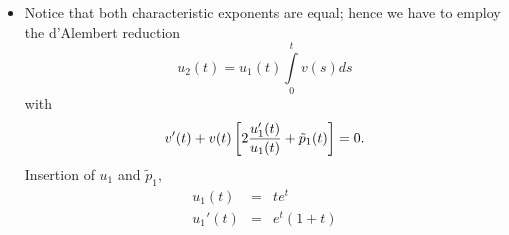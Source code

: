 {\begin{enumerate}
\begin{itemize}
\begin{eqnarray}
         w_n\Bigl[(n+\sigma)(n+\sigma-2)+1\Bigr]-
            w_{n-1}(n+\sigma-1)&=&0. \label{eqn:5.3.2}
      \end{eqnarray}
      ad (\ref{eqn:5.3.1}) for $w_0$:
      \begin{eqnarray*}
         \sigma(\sigma-2)+1&=&0\\
         \sigma^2-2\sigma+1&=&0\\
         (\sigma-1)^2&=&0\quad \Longrightarrow\ \sigma_\infty^{(1,2)}=1
      \end{eqnarray*}
      The characteristic exponent is $\sigma_\infty^{(1)}=
      \sigma_\infty^{(2)}=1$.\medskip\\
      ad (\ref{eqn:5.3.2}) for $w_n$:
      For the coefficients $w_n$ we obtain the recursion formula
      \begin{eqnarray*}
         w_n\Bigl[(n+\sigma)(n+\sigma-2)+1\Bigr]&=&w_{n-1}(n+\sigma-1)\\
         \Longrightarrow\ w_n&=&{n+\sigma-1\over (n+\sigma)(n+\sigma-2)+1}
         w_{n-1}.
      \end{eqnarray*}
      Let us insert $\sigma=1$:
      $$
         w_n={n\over (n+1)(n-1)+1}w_{n-1}={n\over n^2-1+1}w_{n-1}=
         {n\over n^2}w_{n-1}={1\over n}w_{n-1}.
      $$
      We can fix $w_0=1$, hence:
      \begin{eqnarray*}
         w_0&=&1={1\over 1}={1\over 0!}\\
         w_1&=&{1\over 1}={1\over 1!}\\
         w_2&=&{1\over 1\cdot 2}={1\over 2!}\\
         w_3&=&{1\over 1\cdot 2\cdot 3}={1\over 3!}\\
         &\vdots\\
         w_n&=&{1\over 1\cdot 2\cdot 3\cdot\,\cdots\,\cdot n}={1\over n!}
      \end{eqnarray*}
      And finally,
      $$
         u_1(t)=t^\sigma\sum_{n=0}^\infty w_n t^n=t\sum_{n=0}^\infty
         {t^n\over n!}=te^t .
      $$
\item Notice that both characteristic exponents are equal; hence we have to employ  the
d'Alembert reduction
      $$
         u_2(t)=u_1(t)\int\limits_0^t v(s)ds
      $$
      with
      $$
         v'(t)+v(t)\left[2{u_1'(t)\over u_1(t)}+\tilde p_1(t)\right]=0.
      $$
     Insertion of $u_1$ and $\tilde p_1$,
      \begin{eqnarray*}
         u_1(t)&=&te^t\\
         u_1'(t)&=&e^t(1+t)\\

\end{eqnarray*}
\end{itemize}
\end{enumerate}}
